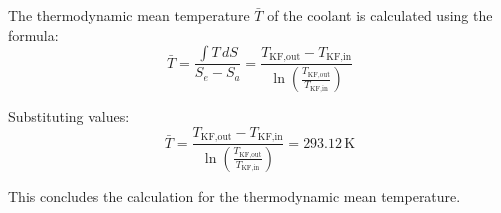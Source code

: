 The thermodynamic mean temperature \( \bar{T} \) of the coolant is calculated using the formula:  
\[
\bar{T} = \frac{\int T \, dS}{S_e - S_a} = \frac{T_{\text{KF,out}} - T_{\text{KF,in}}}{\ln \left( \frac{T_{\text{KF,out}}}{T_{\text{KF,in}}} \right)}
\]  

Substituting values:  
\[
\bar{T} = \frac{T_{\text{KF,out}} - T_{\text{KF,in}}}{\ln \left( \frac{T_{\text{KF,out}}}{T_{\text{KF,in}}} \right)} = 293.12 \, \text{K}
\]  

This concludes the calculation for the thermodynamic mean temperature.